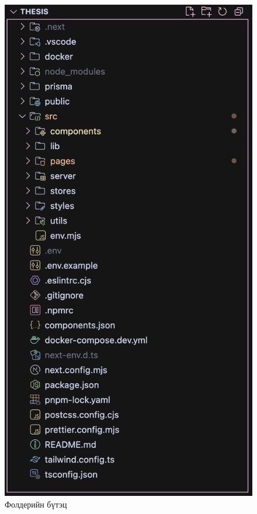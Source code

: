 \begin{figure}[h]
	\centering
	\includegraphics[scale=0.55]{assets/web/structure.png}
	\caption{Фолдерийн бүтэц}
	\label{fig:architecture}
\end{figure}
